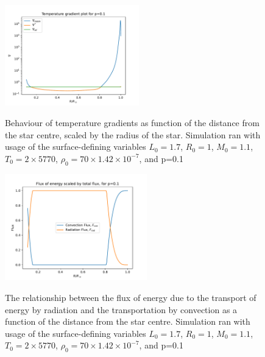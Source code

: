 \documentclass[10pt, nofootinbib, twocolumn]{revtex4-1}
\begin{document}
\begin{figure}[H]
    \caption{Behaviour of temperature gradients as function of the distance from the star centre, scaled by the radius of the star. Simulation ran with usage of the surface-defining variables $L_0=1.7$, $R_0=1$, $M_0=1.1$, $T_0=2\times5770$, $\rho_0=70\times1.42\times 10^{-7}$, and p=0.1}
    \centering
    \includegraphics[width = 0.52\textwidth]{Figures/TemperatureGradientsfinal.pdf} 
    \label{fig:grad}
\end{figure} 

\newpage
\begin{figure}[H]
    \caption{The relationship between the flux of energy due to the transport of energy by radiation and the transportation by convection as a function of the distance from the star centre. Simulation ran with usage of the surface-defining variables  $L_0=1.7$, $R_0=1$, $M_0=1.1$, $T_0=2\times5770$, $\rho_0=70\times1.42\times 10^{-7}$, and p=0.1}
    \centering
    \includegraphics[width = 0.55\textwidth]{Figures/Fluxfinal.pdf} 
    \label{fig:flux}
\end{figure} 
\end{document}
